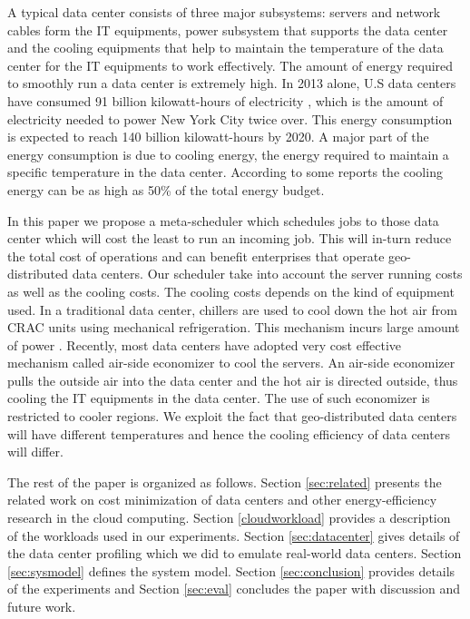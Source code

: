 \documentclass[conference,12pt]{IEEEtran}
\begin{document}
A typical data center consists of three major subsystems: servers and network cables form the IT equipments, power subsystem that supports the data center and the cooling equipments that help to maintain the temperature of the data center for the IT equipments to work effectively. The amount of energy required to smoothly run a data center is extremely high. In 2013 alone, U.S data centers have consumed 91 billion kilowatt-hours of electricity \cite{nrdcreport}, which is the amount of electricity needed to power New York City twice over. This energy consumption is expected to reach 140 billion kilowatt-hours by 2020. A major part of the energy consumption is due to cooling energy, the energy required to maintain a specific temperature in the data center. According to some reports the cooling energy can be as high as 50\% \cite{sullivan2002alternating} \cite{patel2003smart} \cite{sawyer2004calculating} of the total energy budget. 

In this paper we propose a meta-scheduler which schedules jobs to those data center which will cost the least to run an incoming job. This will in-turn reduce the total cost of operations and can benefit enterprises that operate geo-distributed data centers. Our scheduler take into account the server running costs as well as the cooling costs. The cooling costs depends on the kind of equipment used. In a traditional data center, chillers are used to cool down the hot air from CRAC units using mechanical refrigeration. This mechanism incurs large amount of power \cite{zhou2012optimization}. Recently, most data centers have adopted very cost effective mechanism called air-side economizer to cool the servers. An air-side economizer pulls the outside air into the data center and the hot air is directed outside, thus cooling the IT equipments in the data center. The use of such economizer is restricted to cooler regions. We exploit the fact that geo-distributed data centers will have different temperatures and hence the cooling efficiency of data centers will differ. 

The rest of the paper is organized as follows. Section \ref{sec:related} presents the related work on cost minimization of data centers and other energy-efficiency research in the cloud computing. Section \ref{cloudworkload} provides a description of the workloads used in our experiments. Section \ref{sec:datacenter} gives details of the data center profiling which we did to emulate real-world data centers. Section \ref{sec:sysmodel} defines the system model. Section \ref{sec:conclusion} provides details of the experiments and Section \ref{sec:eval} concludes the paper with discussion and future work. 
\end{document}
